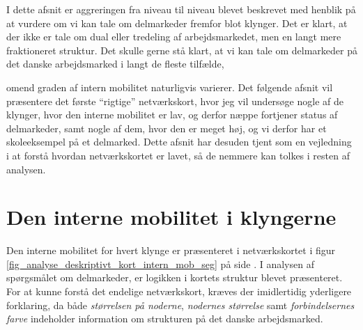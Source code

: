 I dette afsnit er aggreringen fra niveau til niveau blevet beskrevet med henblik på at vurdere om vi kan tale om delmarkeder fremfor blot klynger. Det er klart, at der ikke er tale om dual eller tredeling af arbejdsmarkedet, men en langt mere fraktioneret struktur. Det skulle gerne stå klart, at vi kan tale om delmarkeder på det danske arbejdsmarked i langt de fleste tilfælde,


 omend graden af intern mobilitet naturligvis varierer. Det følgende afsnit vil præsentere det første “rigtige” netværkskort, hvor jeg vil undersøge nogle af de klynger, hvor den interne mobilitet er lav, og derfor næppe fortjener status af delmarkeder, samt nogle af dem, hvor den er meget høj, og vi derfor har et skoleeksempel på et delmarked.
 Dette afsnit har desuden tjent som en vejledning i at forstå hvordan netværkskortet er lavet, så de nemmere kan tolkes i resten af analysen.


\section{Den interne mobilitet i klyngerne \label{analyse_deskriptivt_within_mob_seg}}



Den interne mobilitet for hvert klynge er præsenteret i netværkskortet i figur \ref{fig_analyse_deskriptivt_kort_intern_mob_seg} på side . I analysen af spørgsmålet om delmarkeder, er logikken i kortets struktur blevet præsenteret. For at kunne forstå det endelige netværkskort, kræves der imidlertidig yderligere forklaring, da både \emph{størrelsen på noderne}, \emph{nodernes størrelse}  samt \emph{forbindelsernes farve} indeholder information om strukturen på det danske arbejdsmarked.

